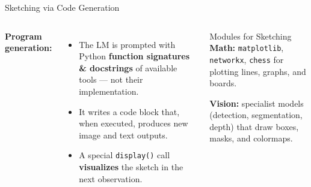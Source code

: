 \documentclass[aspectratio=169]{beamer}
\begin{document}
\begin{frame}{Sketching via Code Generation}
  \begin{columns}
    \textbf{Program generation:}
    \begin{itemize}
      \item The LM is prompted with Python \textbf{function signatures
            \& docstrings} of available tools --- not their implementation.
      \item It writes a code block that, when executed, produces new
            image and text outputs.
      \item A special \texttt{display()} call \textbf{visualizes} the
            sketch in the next observation.
    \end{itemize}
    \begin{block}{Modules for Sketching}
      \textbf{Math:} \texttt{matplotlib}, \texttt{networkx},
      \texttt{chess} for plotting lines, graphs, and boards.
      \vspace{0.2cm}

      \textbf{Vision:} specialist models (detection, segmentation, depth)
      that draw boxes, masks, and colormaps.
    \end{block}
  \end{columns}
\end{frame}
\end{document}
